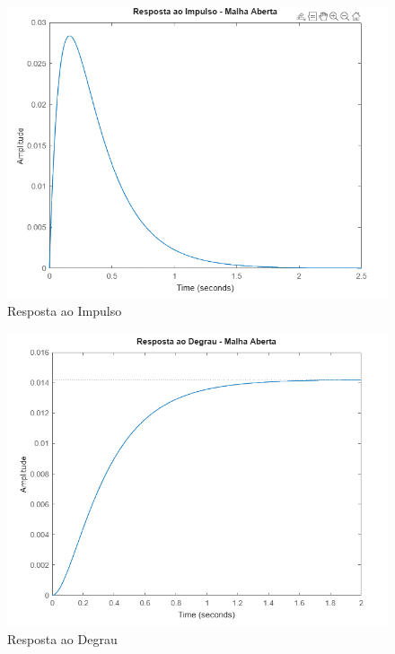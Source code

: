\documentclass[a4paper, 12pt]{article}
\begin{document}
\begin{itemize}
    \begin{figure}[H]
        \centering
        \includegraphics[width=0.75\linewidth]{impulse.png}
        \caption{Resposta ao Impulso}
        \label{fig:enter-label}
    \end{figure}

    \begin{figure}[H]
        \centering
        \includegraphics[width=0.75\linewidth]{step.png}
        \caption{Resposta ao Degrau}
        \label{fig:enter-label}
    \end{figure}


\end{itemize}
\end{document}
